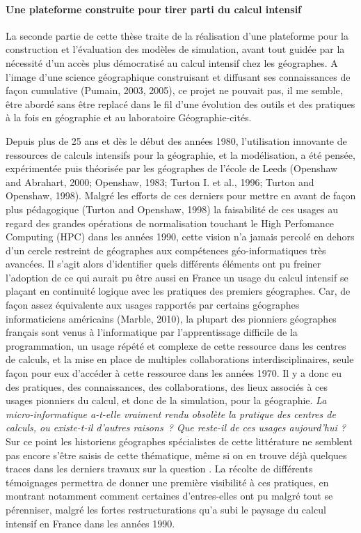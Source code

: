 \paragraph*{Une plateforme construite pour tirer parti du calcul intensif}

La seconde partie de cette thèse traite de la réalisation d'une plateforme pour la construction et l'évaluation des modèles de simulation, avant tout guidée par la nécessité d'un accès plus  démocratisé au calcul intensif chez les géographes. A l'image d'une science géographique construisant et diffusant ses connaissances de façon cumulative (Pumain, 2003, 2005)⁠, ce projet ne pouvait pas, il me semble, être abordé sans être replacé dans le fil d'une évolution des outils et des pratiques à la fois en géographie et au laboratoire Géographie-cités.

Depuis plus de 25 ans et dès le début des années 1980, l'utilisation innovante de ressources de calculs intensifs pour la géographie, et la modélisation, a été pensée, expérimentée puis théorisée par les géographes de l'école de Leeds (Openshaw and Abrahart, 2000; Openshaw, 1983; Turton I. et al., 1996; Turton and Openshaw, 1998)⁠. Malgré les efforts de ces derniers pour mettre en avant de façon plus pédagogique (Turton and Openshaw, 1998) la faisabilité de ces usages au regard des grandes opérations de normalisation touchant le High Perfomance Computing (HPC) dans les années 1990, cette vision n'a jamais percolé en dehors d'un cercle restreint de géographes aux compétences géo-informatiques très avancées. Il s'agit alors d'identifier quels différents éléments ont pu freiner l'adoption de ce qui aurait pu être aussi en France un usage du calcul intensif se plaçant en continuité logique avec les pratiques des premiers géographes. Car, de façon assez équivalente aux usages rapportés par certains géographes informaticiens américains (Marble, 2010)⁠, la plupart des pionniers géographes français sont venus à l'informatique par l'apprentissage difficile de la programmation, un usage répété et complexe de cette ressource dans les centres de calculs, et la mise en place de multiples collaborations interdisciplinaires, seule façon pour eux d'accéder à cette ressource dans les années 1970. Il y a donc eu des pratiques, des connaissances, des collaborations, des lieux associés à ces usages pionniers du calcul, et donc de la simulation, pour la géographie. \textit{La micro-informatique a-t-elle vraiment rendu obsolète la pratique des centres de calculs, ou existe-t-il d'autres raisons ? Que reste-il de ces usages aujourd'hui ?} Sur ce point les historiens géographes spécialistes de cette littérature ne semblent pas encore s'être saisis de cette thématique, même si on en trouve déjà quelques traces dans les derniers travaux sur la question \autocite{Cuyala2014}⁠. La récolte de différents témoignages permettra de donner une première visibilité à ces pratiques, en montrant notamment comment certaines d'entres-elles ont pu malgré tout se pérenniser, malgré les fortes restructurations qu'a subi le paysage du calcul intensif en France dans les années 1990.


